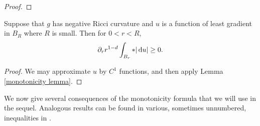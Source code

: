 \begin{proof}
\end{proof}

\begin{proposition}\label{Monotonicity Formula}
Suppose that $g$ has negative Ricci curvature and $u$ is a function of least gradient in $B_R$ where $R$ is small. Then for $0 < r < R$,
$$\partial_r r^{1 - d} \int_{B_r} *|\mathop{}\!\mathrm{d} u| \geq 0.$$
\end{proposition}
\begin{proof}
We may approximate $u$ by $C^1$ functions, and then apply Lemma \ref{monotonicity lemma}.
\end{proof}

We now give several consequences of the monotonicity formula that we will use in the sequel.
Analogous results can be found in various, sometimes unnumbered, inequalities in \cite[Chapter 5]{Giusti77}.

